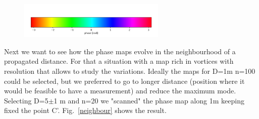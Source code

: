 \documentclass{iucr}              %
\newcommand{\inblue}[1]{{\color{blue}#1}}
\begin{document}
\begin{figure}
\includegraphics[width=7cm]{Figures/color_bar.png}
\label{pointC_propagated}
\end{figure}

Next we want to see how the phase maps evolve in the neighbourhood of a propagated distance. For that a situation with a map rich in vortices with resolution that allows to study the variations. Ideally the maps for D=1m n=100 could be selected, but we preferred to go to longer distance (position where it would be feasible to have a measurement) and reduce the maximum mode. Selecting D=5$\pm$1 m and n=20 we "scanned" the phase map along 1m keeping fixed the point C'. \inblue{Fig.~\ref{neighbour}} shows the result. 
\end{document}
